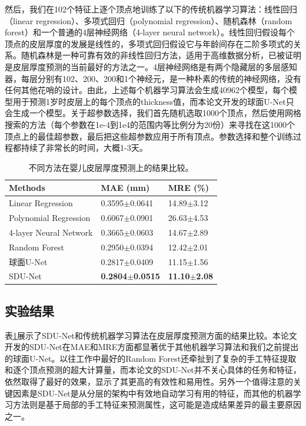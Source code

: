 然后，我们在102个特征上逐个顶点地训练了以下的传统机器学习算法：线性回归（linear regression）、多项式回归（polynomial regression）、随机森林（random forest）和一个普通的4层神经网络（4-layer neural network）。线性回归假设每个顶点的皮层厚度的发展是线性的，多项式回归假设它与年龄间存在二阶多项式的关系。随机森林是一种可靠有效的非线性回归方法，适用于高维数据分析，已被证明是皮层厚度预测的当前最好的方法之一\cite{meng2017can}。4层神经网络是有两个隐藏层的多层感知器，每层分别有102、200、200和1个神经元，是一种朴素的传统的神经网络，没有任何其他花哨的设计。由此，上述每个机器学习算法会生成40962个模型，每个模型用于预测1岁时皮层上的每个顶点的thickness值，而本论文开发的球面U-Net只会生成一个模型。关于超参数选择，我们首先随机选取1000个顶点，然后使用网格搜索的方法（每个参数在1e-4到1e4的范围内等比例分为20份）来寻找在这1000个顶点上的最佳超参数，最后把这些超参数应用于所有顶点。参数选择和整个训练过程都持续了非常长的时间，大概1-3天。

\begin{table}[t]
		\caption{不同方法在婴儿皮层厚度预测上的结果比较。}
		\label{tab:皮层厚度预测的结果}
		\centering
		\begin{tabularx}{0.8\linewidth}{l|X<{\centering}|X<{\centering}}
			\hline
			Methods                                                &              MAE (mm)          &  MRE (\%)  \\
			\hline   
			Linear Regression                                      &       0.3595$\pm$0.0641        & 14.89$\pm$3.12 \\
			Polynomial Regression                                  &     0.6067$\pm$0.0901          & 26.63$\pm$4.53\\
			4-layer Neural Network                                 &    0.3665$\pm$0.0603           & 14.67$\pm$2.89\\
			Random Forest \cite{meng2017can}                     &    0.2950$\pm$0.0394           &  12.42$\pm$2.01 \\
			球面U-Net \cite{zhao2019spherical_ipmi}        &    0.2817$\pm$0.0409           &   11.15$\pm$1.56  \\
			SDU-Net                                                &   \textbf{0.2804$\pm$0.0515}   &  \textbf{11.10$\pm$2.08}  \\
			\hline
		\end{tabularx}
\end{table}

\subsection{实验结果}
表\ref{tab:皮层厚度预测的结果}展示了SDU-Net和传统机器学习算法在皮层厚度预测方面的结果比较。本论文开发的SDU-Net在MAE和MRE方面都显著优于其他机器学习算法和我们之前提出的球面U-Net。以往工作中最好的Random Forest还牵扯到了复杂的手工特征提取和逐个顶点预测的超大计算量，而本论文的SDU-Net并不关心具体的任务和特征，依然取得了最好的效果，显示了其更高的有效性和易用性。另外一个值得注意的关键因素是SDU-Net是从分层的架构中有效地自动学习有用的特征，而其他的机器学习方法则是基于局部的手工特征来预测属性，这可能是造成结果差异的最主要原因之一。


